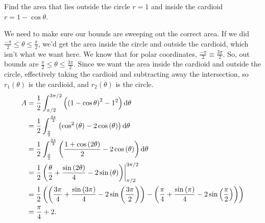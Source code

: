 \begin{example}
	Find the area that lies outside the circle $r=1$ and inside the cardioid $r=1-\cos{\theta}$.
\end{example}
We need to make sure our bounds are sweeping out the correct area.
If we did $\frac{-\pi}{2} \leq \theta \leq \frac{\pi}{2}$, we'd get the area inside the circle and outside the cardioid, which isn't what we want here.
We know that for polar coordinates, $\frac{-\pi}{2} \equiv \frac{3\pi}{2}$.
So, out bounds are $\frac{\pi}{2} \leq \theta \leq \frac{3\pi}{2}$.
Since we want the area inside the cardioid and outside the circle, effectively taking the cardioid and subtracting away the intersection, so $r_1(\theta)$ is the cardioid, and $r_2(\theta)$ is the circle.
\begin{align*}
	A &= \frac{1}{2}\int_{\pi/2}^{3\pi/2}{\left(\left(1-\cos{\theta}\right)^2-1^2\right)\mathrm{d} \theta} \\
	&= \frac{1}{2}\int_{\frac{\pi}{2}}^{\frac{3\pi}{2}}\left(\cos^{2}\left(\theta\right)-2\cos\left(\theta\right)\right)\mathrm{d} \theta \\
	&= \frac{1}{2}\int_{\frac{\pi}{2}}^{\frac{3\pi}{2}}\left(\frac{1+\cos\left(2\theta\right)}{2}-2\cos\left(\theta\right)\right)\mathrm{d} \theta \\
	&= \frac{1}{2}\left(\frac{\theta}{2}+\frac{\sin\left(2\theta\right)}{4}-2\sin\left(\theta\right)\right)\biggr\rvert_{\pi/2}^{3\pi/2} \\
	&= \frac{1}{2}\left(\left(\frac{3\pi}{4}+\frac{\sin\left(3\pi\right)}{4}-2\sin\left(\frac{3\pi}{2}\right)\right)-\left(\frac{\pi}{4}+\frac{\sin\left(\pi\right)}{4}-2\sin\left(\frac{\pi}{2}\right)\right)\right) \\
	&= \frac{\pi}{4}+2.
\end{align*}

